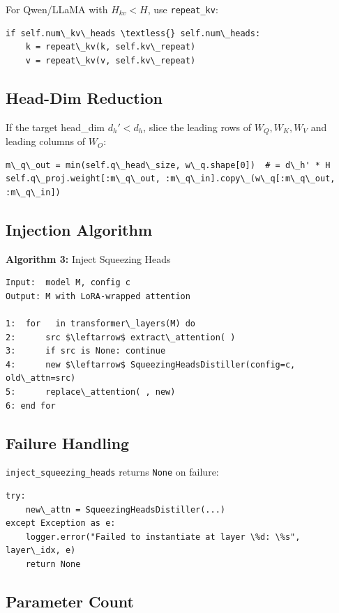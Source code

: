 For Qwen/LLaMA with $H_{kv} < H$, use \texttt{repeat\_kv}:

\begin{lstlisting}
if self.num\_kv\_heads \textless{} self.num\_heads:
    k = repeat\_kv(k, self.kv\_repeat)
    v = repeat\_kv(v, self.kv\_repeat)
\end{lstlisting}

\subsection{Head-Dim Reduction}

If the target head\_dim $d_h' < d_h$, slice the leading rows of $W_Q, W_K, W_V$ 
and leading columns of $W_O$:

\begin{lstlisting}
m\_q\_out = min(self.q\_head\_size, w\_q.shape[0])  # = d\_h' * H
self.q\_proj.weight[:m\_q\_out, :m\_q\_in].copy\_(w\_q[:m\_q\_out, :m\_q\_in])
\end{lstlisting}

\subsection{Injection Algorithm}

\textbf{Algorithm 3:} Inject Squeezing Heads
\begin{lstlisting}
Input:  model M, config c
Output: M with LoRA-wrapped attention

1:  for   in transformer\_layers(M) do
2:      src $\leftarrow$ extract\_attention( )
3:      if src is None: continue
4:      new $\leftarrow$ SqueezingHeadsDistiller(config=c, old\_attn=src)
5:      replace\_attention( , new)
6: end for
\end{lstlisting}

\subsection{Failure Handling}

\texttt{inject\_squeezing\_heads} returns \texttt{None} on failure:

\begin{lstlisting}
try:
    new\_attn = SqueezingHeadsDistiller(...)
except Exception as e:
    logger.error("Failed to instantiate at layer \%d: \%s", layer\_idx, e)
    return None
\end{lstlisting}

\subsection{Parameter Count}

